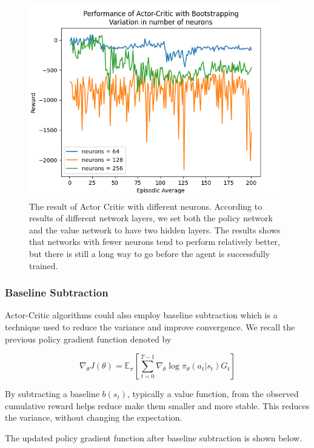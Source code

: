 \documentclass{article}
\begin{document}
\begin{figure}[htbp]
\centering
\includegraphics[width=0.9\linewidth]{Report/images/Performance_of_Actor_Critic_BS_Neurons.png}
\caption{\label{fig:ActorCritic for different Neurons}The result of Actor Critic with different neurons. According to results of different network layers, we set both the policy network and the value network to have two hidden layers. The results shows that networks with fewer neurons tend to perform relatively better, but there is still a long way to go before the agent is successfully trained.}
\end{figure}






\subsubsection{Baseline Subtraction}
Actor-Critic algorithms could also employ baseline subtraction which is a technique used to reduce the variance and improve convergence. We recall the previous policy gradient function denoted by 

\begin{equation*}
\nabla_\theta J(\theta) = \mathbb{E}_\pi[\sum _{t=0}^{T-1}  \nabla_\theta \log\pi_\theta (a_t|s_t)G_t]
\end{equation*}

By subtracting a baseline $b(s_t)$, typically a value function,  from the observed cumulative reward helps reduce make them smaller and more stable. This reduces the variance, without changing the expectation. \cite{david-ucl-lecture}

The updated policy gradient function after baseline subtraction is shown below. 
\end{document}
